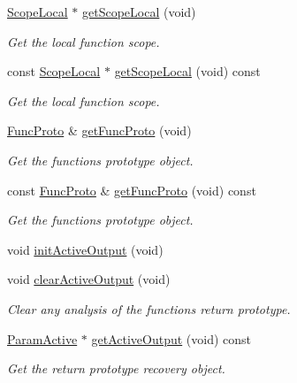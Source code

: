 \begin{DoxyCompactItemize}
\mbox{\hyperlink{class_scope_local}{Scope\+Local}} $\ast$ \mbox{\hyperlink{class_funcdata_aaa28789a086c52edd04c41e265818bbb}{get\+Scope\+Local}} (void)
\begin{DoxyCompactList}\small\item\em Get the local function scope. \end{DoxyCompactList}\item 
const \mbox{\hyperlink{class_scope_local}{Scope\+Local}} $\ast$ \mbox{\hyperlink{class_funcdata_a119d29273d0e896ee16d7581f7548a80}{get\+Scope\+Local}} (void) const
\begin{DoxyCompactList}\small\item\em Get the local function scope. \end{DoxyCompactList}\item 
\mbox{\hyperlink{class_func_proto}{Func\+Proto}} \& \mbox{\hyperlink{class_funcdata_a1b1961c6d9c58e9a0a20f74c6e49853f}{get\+Func\+Proto}} (void)
\begin{DoxyCompactList}\small\item\em Get the function\textquotesingle{}s prototype object. \end{DoxyCompactList}\item 
const \mbox{\hyperlink{class_func_proto}{Func\+Proto}} \& \mbox{\hyperlink{class_funcdata_af99d6aeaee949a45ec935756a93b99da}{get\+Func\+Proto}} (void) const
\begin{DoxyCompactList}\small\item\em Get the function\textquotesingle{}s prototype object. \end{DoxyCompactList}\item 
void \mbox{\hyperlink{class_funcdata_ae454fbd3566fbd43103dcabdf2681fd8}{init\+Active\+Output}} (void)
\item 
void \mbox{\hyperlink{class_funcdata_a8f29c20e2a01d0cbf600b613e929e88c}{clear\+Active\+Output}} (void)
\begin{DoxyCompactList}\small\item\em Clear any analysis of the function\textquotesingle{}s {\itshape return} prototype. \end{DoxyCompactList}\item 
\mbox{\hyperlink{class_param_active}{Param\+Active}} $\ast$ \mbox{\hyperlink{class_funcdata_a4a711cda20fb99632665753918c03a65}{get\+Active\+Output}} (void) const
\begin{DoxyCompactList}\small\item\em Get the {\itshape return} prototype recovery object. \end{DoxyCompactList}\item 

\end{DoxyCompactItemize}
